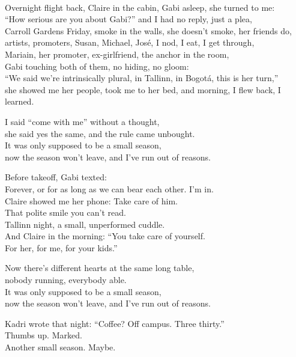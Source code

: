 \begin{lyrics}
\\
Overnight flight back, Claire in the cabin, Gabi asleep, she turned to me:\\
“How serious are you about Gabi?” and I had no reply, just a plea,\\
Carroll Gardens Friday, smoke in the walls, she doesn’t smoke, her friends do,\\
artists, promoters, Susan, Michael, José, I nod, I eat, I get through,\\
Mariain, her promoter, ex-girlfriend, the anchor in the room,\\
Gabi touching both of them, no hiding, no gloom:\\
“We said we’re intrinsically plural, in Tallinn, in Bogotá, this is her turn,”\\
she showed me her people, took me to her bed, and morning, I flew back, I learned.

I said “come with me” without a thought,\\
she said yes the same, and the rule came unbought.\\
It was only supposed to be a small season,\\
now the season won’t leave, and I’ve run out of reasons.

Before takeoff, Gabi texted:\\
Forever, or for as long as we can bear each other. I’m in.\\
Claire showed me her phone: Take care of him.\\
That polite smile you can’t read.\\
Tallinn night, a small, unperformed cuddle.\\
And Claire in the morning: “You take care of yourself.\\
For her, for me, for your kids.”

Now there’s different hearts at the same long table,\\
nobody running, everybody able.\\
It was only supposed to be a small season,\\
now the season won’t leave, and I’ve run out of reasons.

Kadri wrote that night: “Coffee? Off campus. Three thirty.”\\
Thumbs up. Marked.\\
Another small season. Maybe.
\end{lyrics}

